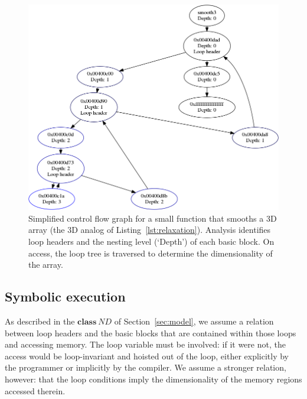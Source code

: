 %
\begin{figure}
  \centering
  \includegraphics[width=\linewidth]{images/dbg/s3}

  \caption{Simplified control flow graph for a small function that
  smooths a 3D array (the 3D analog of Listing~\ref{lst:relaxation}).
  Analysis identifies loop headers and the nesting level (`Depth') of
  each basic block.  On access, the loop tree is traversed to determine
  the dimensionality of the array.}

  \label{fig:cfg}
\end{figure}

\subsection{Symbolic execution}

As described in the $\textbf{class} \ ND$ of Section~\ref{sec:model},
we assume a relation between loop headers and the basic blocks that are
contained within those loops and accessing memory.  The loop variable
must be involved: if it were not, the access would be loop-invariant
and hoisted out of the loop, either explicitly by the programmer or
implicitly by the compiler.  We assume a stronger relation, however:
that the loop conditions imply the dimensionality of the memory regions
accessed therein.

